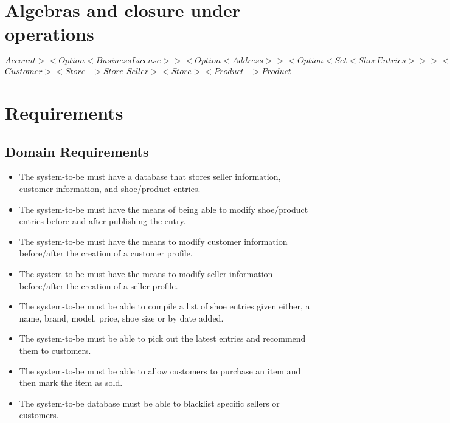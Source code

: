 \section{Algebras and closure under operations}
 $Account >< Option<BusinessLicense>> < Option<Address> >< Option<Set<ShoeEntries>> >< Store -> Store$  $Customer >< Store -> Store$  $Seller >< Store >< Product -> Product$ 
\newpage
\section{Requirements}
\subsection{Domain Requirements}
\begin{itemize}
  \item The system-to-be must have a database that stores seller information, customer information, and shoe/product entries.
  \item The system-to-be must have the means of being able to modify shoe/product entries before and after publishing the entry.
  \item The system-to-be must have the means to modify customer information before/after the creation of a customer profile.
  \item The system-to-be must have the means to modify seller information before/after the creation of a seller profile.
  \item The system-to-be must be able to compile a list of shoe entries given either, a name, brand, model, price, shoe size or by date added.
  \item The system-to-be must be able to pick out the latest entries and recommend them to customers.
  \item The system-to-be must be able to allow customers to purchase an item and then mark the item as sold.
  \item The system-to-be database must be able to blacklist specific sellers or customers.
\end{itemize}
